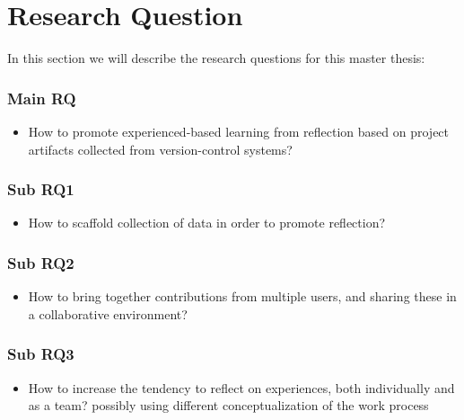 \section{Research Question}
In this section we will describe the research questions for this master thesis:
\subsubsection{Main RQ}
\begin{itemize}
	\item How to promote experienced-based learning from reflection based on project artifacts collected from version-control systems?
\end{itemize}
\subsubsection{Sub RQ1}
\begin{itemize}
	\item How to scaffold collection of data in order to promote reflection?
\end{itemize}

\subsubsection{Sub RQ2}
\begin{itemize}
	\item How to bring together contributions from multiple users, and sharing these in a collaborative environment?
\end{itemize}

\subsubsection{Sub RQ3}
\begin{itemize}
	\item How to increase the tendency to reflect on experiences, both individually and as a team? possibly using different conceptualization of the work process
\end{itemize}